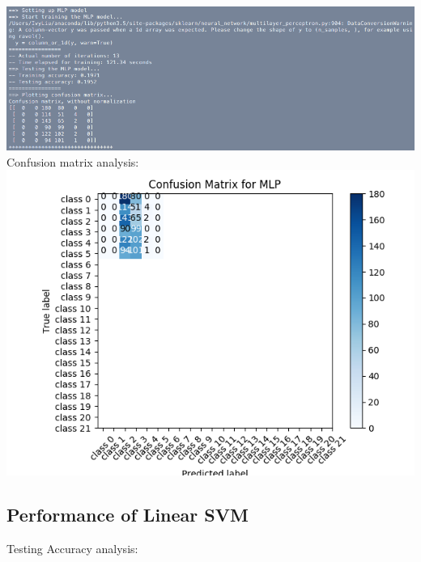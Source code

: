 \documentclass{article}
\begin{document}
\includegraphics[scale=0.4]{4.png}
\\
Confusion matrix analysis: 
\\
\includegraphics[scale=0.4]{MLP_cm.png}

\subsection{Performance of Linear SVM}

Testing Accuracy analysis: 
\end{document}
